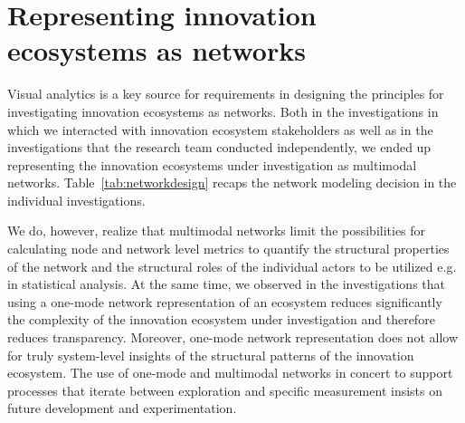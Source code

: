 \section{Representing innovation ecosystems as networks}
\label{sec:networkrepresentation}

Visual analytics is a key source for requirements in designing the principles for investigating innovation ecosystems as networks. Both in the investigations in which we interacted with innovation ecosystem stakeholders as well as in the investigations that the research team conducted independently, we ended up representing the innovation ecosystems under investigation as multimodal networks. Table~\ref{tab:networkdesign} recaps the network modeling decision in the individual investigations.

We do, however, realize that multimodal networks limit the possibilities for calculating node and network level metrics to quantify the structural properties of the network and the structural roles of the individual actors to be utilized e.g. in statistical analysis. At the same time, we observed in the investigations that using a one-mode network representation of an ecosystem reduces significantly the complexity of the innovation ecosystem under investigation and therefore reduces transparency. Moreover, one-mode network representation does not allow for truly system-level insights of the structural patterns of the innovation ecosystem. The use of one-mode and multimodal networks in concert to support processes that iterate between exploration and specific measurement insists on future development and experimentation. 



